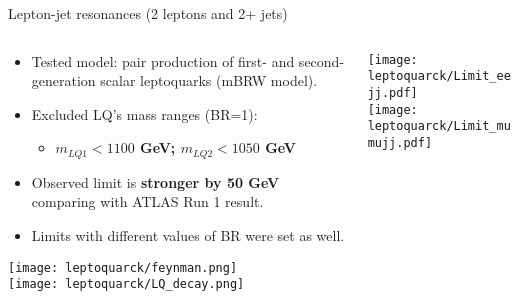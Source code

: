 \documentclass[8pt]{beamer}
\begin{document}
\begin{frame}{\large Lepton-jet resonances {\small (2 leptons and 2+ jets)}}

  \begin{columns}
   \begin{column}{7.5cm}
    \begin{itemize}
      \item Tested model: pair production of first- and second-generation scalar leptoquarks (mBRW model).
      \vspace{0.15cm}
      \item Excluded LQ’s mass ranges (BR=1):
      \begin{itemize}
       \item \textbf{ $m_{LQ1} < 1100$ GeV; $m_{LQ2} < 1050$ GeV }
      \end{itemize}
      \item Observed limit is \textbf{stronger by 50 GeV} comparing with ATLAS Run 1 result. 
      \vspace{0.15cm}

      \item Limits with different values of BR were set as well.
    \end{itemize}
    \vspace{0.05cm}
    {\centering
      \texttt{[image: leptoquarck/feynman.png]}\\
      \texttt{[image: leptoquarck/LQ\_decay.png]}\\
    }

   \end{column}
   \begin{column}{4.5cm}
    \texttt{[image: leptoquarck/Limit\_eejj.pdf]}\\
    \texttt{[image: leptoquarck/Limit\_mumujj.pdf]}\\
   \end{column}
  \end{columns}
\end{frame}
\end{document}
